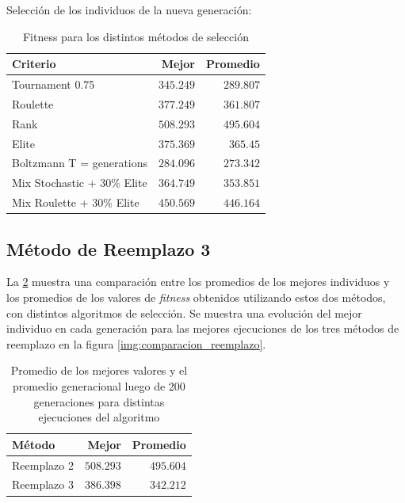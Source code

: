 \documentclass[letterpaper,twocolumn,10pt]{article}
\begin{document}
Selección de los individuos de la nueva generación:
\begin{table}[H]

\begin{center}
\begin{tabular}{l | r | r}
Criterio & Mejor & Promedio \\
\hline
Tournament 0.75 & $345.249$ & $289.807$ \\
Roulette & $377.249$ & $361.807$ \\
Rank & $508.293$ & $495.604$ \\
Elite & $375.369$ & $365.45$ \\
Boltzmann T = generations & $284.096$ & $273.342$ \\
Mix Stochastic + 30\% Elite & $364.749$ & $353.851$ \\
Mix Roulette + 30\% Elite & $450.569$ & $446.164$ \\
\end{tabular}
\end{center}

\caption{Fitness para los distintos métodos de selección}
\label{fig:seleccion-reemplazo2}

\end{table}

\subsection{Método de Reemplazo 3}

La \ref{fig:reemplazo3} muestra una comparación entre los promedios de los mejores
individuos y los promedios de los valores de \textit{fitness} obtenidos utilizando
estos dos métodos, con distintos algoritmos de selección. Se muestra una evolución
del mejor individuo en cada generación para las mejores ejecuciones de los tres
métodos de reemplazo en la figura \ref{img:comparacion_reemplazo}.

\begin{table}[H]

\begin{center}
\begin{tabular}{l | r | r}
Método & Mejor & Promedio \\
\hline
Reemplazo 2 & $508.293$ & $495.604$ \\
Reemplazo 3 & $386.398$ & $342.212$ \\
\end{tabular}
\end{center}

\label{fig:reemplazo3}
\caption{Promedio de los mejores valores y el promedio generacional
luego de 200 generaciones para distintas ejecuciones del algoritmo}

\end{table}
\end{document}
